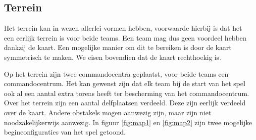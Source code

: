 \subsection{Terrein}
Het terrein kan in wezen allerlei vormen hebben, voorwaarde hierbij is dat het een eerlijk terrein is voor beide teams. Een team mag dus geen voordeel hebben dankzij de kaart. Een mogelijke manier om dit te bereiken is door de kaart symmetrisch te maken. We eisen bovendien dat de kaart rechthoekig is.

Op het terrein zijn twee commandocentra geplaatst, voor beide teams een commandocentrum. Het kan gewenst zijn dat elk team bij de start van het spel ook al een aantal extra torens heeft ter bescherming van het commandocentrum. Over het terrein zijn een aantal delfplaatsen verdeeld. Deze zijn eerlijk verdeeld over de kaart. Andere obstakels mogen aanwezig zijn, maar zijn niet noodzakelijkerwijs aanwezig. In figuur \ref{fig:map1} en \ref{fig:map2} zijn twee mogelijke beginconfiguraties van het spel getoond.
